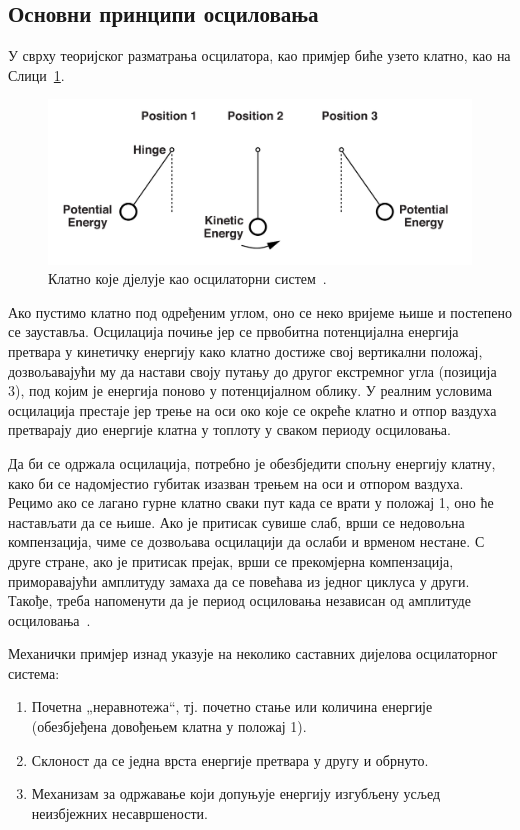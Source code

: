 \documentclass[master]{finthesis}
\begin{document}
\subsection{Основни принципи осциловања}
У сврху теоријског разматрања осцилатора, као примјер биће узето клатно, као на Слици~\ref{pendulum}.
\begin{figure}[!ht]
	 \centering
	 \includegraphics[scale=0.3]{slike/pendulum.png}
 	 \caption{Клатно које дјелује као осцилаторни систем~\cite{Razavi:PLL_CMOS_2020}.}
	 \label{pendulum}
\end{figure}
Ако пустимо клатно под одређеним углом, оно се неко вријеме њише и постепено се зауставља. Осцилација почиње јер се првобитна потенцијална енергија претвара у кинетичку енергију како клатно достиже свој вертикални положај, дозвољавајући му да настави своју путању до другог екстремног угла (позиција 3), под којим је енергија поново у потенцијалном облику. У реалним условима осцилација престаје јер трење на оси око које се окреће клатно и отпор ваздуха претварају дио енергије клатна у топлоту у сваком периоду осциловања. \par
Да би се одржала осцилација, потребно је обезбједити спољну енергију клатну, како би се надомјестио губитак изазван трењем на оси и отпором ваздуха. Рецимо ако се лагано гурне клатно сваки пут када се врати у положај 1, оно ће настављати да се њише. Ако је притисак сувише слаб, врши се недовољна компензација, чиме се дозвољава осцилацији да ослаби и врменом нестане. С друге стране, ако је притисак прејак, врши се прекомјерна компензација, приморавајући амплитуду замаха да се повећава из једног циклуса у други. Такође, треба напоменути да је период осциловања независан од амплитуде осциловања~\cite{Razavi:PLL_CMOS_2020}. \par
Механички примјер изнад указује на неколико саставних дијелова осцилаторног система:
\begin{enumerate}
	\item Почетна „неравнотежа“, тј. почетно стање или количина енергије (обезбјеђена довођењем клатна у положај 1).
	\item Склоност да се једна врста енергије претвара у другу и обрнуто.
	\item Механизам за одржавање који допуњује енергију изгубљену усљед неизбјежних несавршености.
\end{enumerate}
\end{document}
